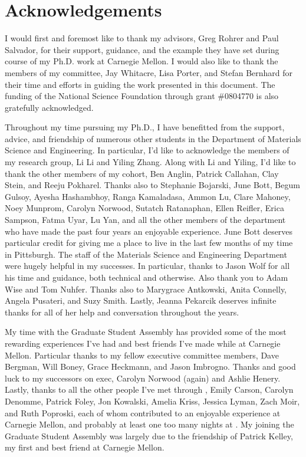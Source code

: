 \chapter{Acknowledgements}


I would first and foremost like to thank my advisors, Greg Rohrer and Paul Salvador, for their support, guidance, and the example they have set during course of my Ph.D. work at Carnegie Mellon. I would also like to thank the members of my committee, Jay Whitacre, Lisa Porter, and Stefan Bernhard for their time and efforts in guiding the work presented in this document. The funding of the National Science Foundation through grant \#0804770 is also gratefully acknowledged.

Throughout my time pursuing my Ph.D., I have benefitted from the support, advice, and friendship of numerous other students in the Department of Materials Science and Engineering. In particular, I'd like to acknowledge the members of my research group, Li Li and Yiling Zhang. Along with Li and Yiling, I'd like to thank the other members of my cohort, Ben Anglin, Patrick Callahan, Clay Stein, and Reeju Pokharel. Thanks also to Stephanie Bojarski, June Bott, Begum Gulsoy, Ayesha Hashambhoy, Ranga Kamaladasa, Ammon Lu, Clare Mahoney, Noey Munprom, Carolyn Norwood, Sutatch Ratanaphan, Ellen Reifler, Erica Sampson, Fatma Uyar, Lu Yan, and all the other members of the department who have made the past four years an enjoyable experience. June Bott deserves particular credit for giving me a place to live in the last few months of my time in Pittsburgh. The staff of the Materials Science and Engineering Department were hugely helpful in my successes. In particular, thanks to Jason Wolf for all his time and guidance, both technical and otherwise. Also thank you to Adam Wise and Tom Nuhfer. Thanks also to Marygrace Antkowski,  Anita Connelly, Angela Pusateri, and Suzy Smith. Lastly, Jeanna Pekarcik deserves infinite thanks for all of her help and conversation throughout the years.

My time with the Graduate Student Assembly has provided some of the most rewarding experiences I've had and best friends I've made while at Carnegie Mellon. Particular thanks to my fellow  executive committee members, Dave Bergman, Will Boney, Grace Heckmann, and Jason Imbrogno. Thanks and good luck to my successors on  exec, Carolyn Norwood (again) and Ashlie Henery. Lastly, thanks to all the other people I've met through , Emily Carson, Carolyn Denomme, Patrick Foley, Jon Kowalski, Amelia Kriss, Jessica Lyman, Zach Moir, and Ruth Poproski, each of whom contributed to an enjoyable experience at Carnegie Mellon, and probably at least one too many nights at . My joining the Graduate Student Assembly was largely due to the friendship of Patrick Kelley, my first and best friend at Carnegie Mellon. 

